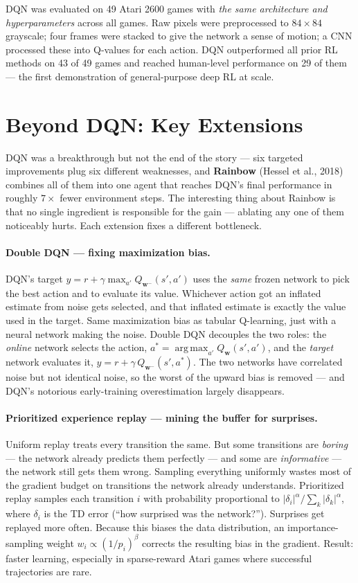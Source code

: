 \documentclass[11pt, oneside]{book}
\newcommand{\argmax}{\operatorname*{arg\,max}}
\begin{document}
DQN was evaluated on 49 Atari 2600 games with \emph{the same architecture and
hyperparameters} across all games.
Raw pixels were preprocessed to $84\times84$ grayscale; four frames were stacked
to give the network a sense of motion; a CNN processed these into Q-values for
each action.
DQN outperformed all prior RL methods on 43 of 49 games and reached
human-level performance on 29 of them --- the first demonstration of
general-purpose deep RL at scale.

\section{Beyond DQN: Key Extensions}

DQN was a breakthrough but not the end of the story --- six targeted improvements
plug six different weaknesses, and \textbf{Rainbow} (Hessel et al., 2018) combines all
of them into one agent that reaches DQN's final performance in roughly $7\times$ fewer
environment steps.
The interesting thing about Rainbow is that no single ingredient is responsible for
the gain --- ablating any one of them noticeably hurts. Each extension fixes a
different bottleneck.

\paragraph{Double DQN --- fixing maximization bias.}
DQN's target $y = r + \gamma \max_{a'} Q_{\mathbf{w}^-}(s', a')$ uses the \emph{same}
frozen network to pick the best action and to evaluate its value. Whichever action
got an inflated estimate from noise gets selected, and that inflated estimate is
exactly the value used in the target. Same maximization bias as tabular Q-learning,
just with a neural network making the noise.
Double DQN decouples the two roles: the \emph{online} network selects the action,
$a^* = \argmax_{a'} Q_\mathbf{w}(s', a')$, and the \emph{target} network evaluates it,
$y = r + \gamma\, Q_{\mathbf{w}^-}(s', a^*)$.
The two networks have correlated noise but not identical noise, so the worst of the
upward bias is removed --- and DQN's notorious early-training overestimation largely
disappears.

\paragraph{Prioritized experience replay --- mining the buffer for surprises.}
Uniform replay treats every transition the same. But some transitions are
\emph{boring} --- the network already predicts them perfectly --- and some are
\emph{informative} --- the network still gets them wrong.
Sampling everything uniformly wastes most of the gradient budget on transitions the
network already understands.
Prioritized replay samples each transition $i$ with probability proportional to
$|\delta_i|^\alpha / \sum_k |\delta_k|^\alpha$, where $\delta_i$ is the TD error
(``how surprised was the network?''). Surprises get replayed more often. Because this
biases the data distribution, an importance-sampling weight $w_i \propto (1/p_i)^\beta$
corrects the resulting bias in the gradient. Result: faster learning, especially in
sparse-reward Atari games where successful trajectories are rare.
\end{document}
